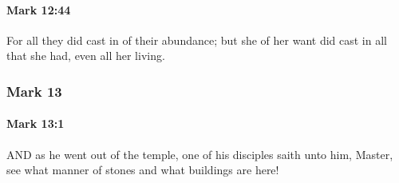 		\paragraph{Mark 12:44} %
			\label{MARK-12-44}

			For all they did cast in of their abundance; but she of her want did cast in all that she had, even all her living.

			\begin{framed}
			\scriptsize
				\begin{compactdesc}
					\item[SBLG] 
				\end{compactdesc}
			\end{framed}

	\subsubsection{Mark 13} %
		\label{MARK-13}
		
		\paragraph{Mark 13:1} %
			\label{MARK-13-1}

			AND as he went out of the temple, one of his disciples saith unto him, Master, see what manner of stones and what buildings are here!

